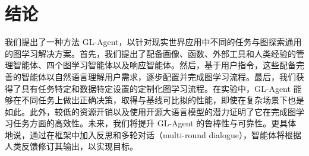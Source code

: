 \documentclass[11pt,UTF8,fontset=fandol]{ctexart}
\begin{document}
\section{结论}

我们提出了一种方法 GL-Agent，以针对现实世界应用中不同的任务与图探索通用的图学习解决方案。首先，我们提出了配备画像、函数、外部工具和人类经验的管理智能体、四个图学习智能体以及响应智能体。然后，基于用户指令，这些配备完善的智能体以自然语言理解用户需求，逐步配置并完成图学习流程。最后，我们获得了具有任务特定和数据特定设置的定制化图学习流程。在实验中，GL-Agent 能够在不同任务上做出正确决策，取得与基线可比拟的性能，即使在复杂场景下也是如此。此外，较低的资源开销以及使用开源大语言模型的潜力证明了它在完成图学习任务方面的高效性。未来，我们将提升 GL-Agent 的鲁棒性与可靠性。更具体地说，通过在框架中加入反思和多轮对话（multi-round dialogue），智能体将根据人类反馈修订其输出，以实现目标。
\end{document}
